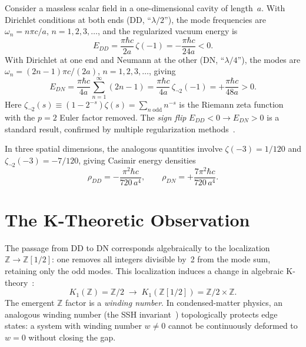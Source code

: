 \documentclass[aps,prl,twocolumn,superscriptaddress,nofootinbib]{revtex4-2}
\begin{document}
Consider a massless scalar field in a one-dimensional cavity of
length~$a$.  With Dirichlet conditions at both ends (DD, ``$\lambda/2$''),
the mode frequencies are $\omega_n=n\pi c/a$, $n=1,2,3,\ldots$,
and the regularized vacuum energy is
\begin{equation}\label{eq:EDD}
  E_{DD}=\frac{\pi\hbar c}{2a}\,\zeta(-1)
  =-\frac{\pi\hbar c}{24a}<0.
\end{equation}
With Dirichlet at one end and Neumann at the other (DN,
``$\lambda/4$''), the modes are $\omega_n=(2n{-}1)\pi c/(2a)$,
$n=1,2,3,\ldots$, giving
\begin{equation}\label{eq:EDN}
  E_{DN}=\frac{\pi\hbar c}{4a}\sum_{n=1}^{\infty}(2n{-}1)
  =\frac{\pi\hbar c}{4a}\,\zeta_{\neg 2}(-1)
  =+\frac{\pi\hbar c}{48a}>0.
\end{equation}
Here $\zeta_{\neg 2}(s)\equiv(1{-}2^{-s})\zeta(s)
=\sum_{n\;\mathrm{odd}}n^{-s}$ is the Riemann zeta function with
the $p{=}2$ Euler factor removed.  The \emph{sign flip}
$E_{DD}<0\to E_{DN}>0$ is a standard result, confirmed by multiple
regularization methods~\cite{Boyer1974,Kenneth2002,Hertzberg2005,Milton2004}.

In three spatial dimensions, the analogous quantities involve
$\zeta(-3)=1/120$ and $\zeta_{\neg 2}(-3)=-7/120$, giving
Casimir energy densities
\begin{equation}
  \rho_{DD}=-\frac{\pi^2\hbar c}{720\,a^4},\qquad
  \rho_{DN}=+\frac{7\pi^2\hbar c}{720\,a^4}.
\end{equation}

\section{The K-Theoretic Observation}

The passage from DD to DN corresponds algebraically to the
localization $\mathbb{Z}\to\mathbb{Z}[1/2]$: one removes all
integers divisible by~2 from the mode sum, retaining only the
odd modes.  This localization induces a change in algebraic
K-theory~\cite{Quillen1972}:
\begin{equation}\label{eq:K1}
  K_1(\mathbb{Z})=\mathbb{Z}/2
  \;\longrightarrow\;
  K_1(\mathbb{Z}[1/2])=\mathbb{Z}/2\times\mathbb{Z}.
\end{equation}
The emergent $\mathbb{Z}$ factor is a \emph{winding number}.
In condensed-matter physics, an analogous winding number
(the SSH invariant~\cite{SSH1979}) topologically protects
edge states: a system with winding number $w\neq 0$ cannot
be continuously deformed to $w=0$ without closing the gap.
\end{document}
